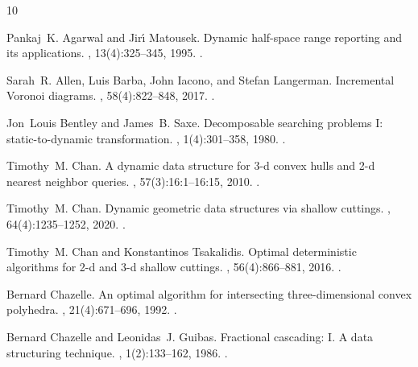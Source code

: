 \documentclass[10pt,a4paper]{amsart}
\begin{document}
\begin{thebibliography}{10}

Pankaj~K. Agarwal and Jir{\'{\i}} Matousek.
\newblock Dynamic half-space range reporting and its applications.
, 13(4):325--345, 1995.
\newblock \href {https://doi.org/10.1007/BF01293483}
  {}.

Sarah~R. Allen, Luis Barba, John Iacono, and Stefan Langerman.
\newblock Incremental {V}oronoi diagrams.
, 58(4):822--848, 2017.
\newblock \href {https://doi.org/10.1007/s00454-017-9943-2}
  {}.

Jon~Louis Bentley and James~B. Saxe.
\newblock Decomposable searching problems {I:} static-to-dynamic
  transformation.
, 1(4):301--358, 1980.
\newblock \href {https://doi.org/10.1016/0196-6774(80)90015-2}
  {}.

Timothy~M. Chan.
\newblock A dynamic data structure for 3-d convex hulls and 2-d nearest
  neighbor queries.
, 57(3):16:1--16:15, 2010.
\newblock \href {https://doi.org/10.1145/1706591.1706596}
  {}.

Timothy~M. Chan.
\newblock Dynamic geometric data structures via shallow cuttings.
, 64(4):1235--1252, 2020.
\newblock \href {https://doi.org/10.1007/s00454-020-00229-5}
  {}.

Timothy~M. Chan and Konstantinos Tsakalidis.
\newblock Optimal deterministic algorithms for 2-d and 3-d shallow cuttings.
, 56(4):866--881, 2016.
\newblock \href {https://doi.org/10.1007/s00454-016-9784-4}
  {}.

Bernard Chazelle.
\newblock An optimal algorithm for intersecting three-dimensional convex
  polyhedra.
, 21(4):671--696, 1992.
\newblock \href {https://doi.org/10.1137/0221041} {}.

Bernard Chazelle and Leonidas~J. Guibas.
\newblock Fractional cascading: I. {A} data structuring technique.
, 1(2):133--162, 1986.
\newblock \href {https://doi.org/10.1007/BF01840440}
  {}.


\end{thebibliography}
\end{document}
